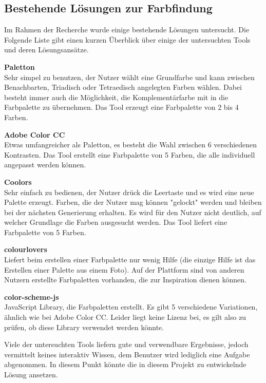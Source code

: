 \subsection{Bestehende Lösungen zur Farbfindung}
Im Rahmen der Recherche wurde einige bestehende Lösungen untersucht. Die Folgende Liste gibt einen kurzen Überblick über einige der untersuchten Tools und deren Lösungsansätze.

\textbf{Paletton} \\
Sehr simpel zu benutzen, der Nutzer wählt eine Grundfarbe und kann zwischen Benachbarten, Triadisch oder Tetraedisch angelegten Farben wählen. Dabei besteht immer auch die Möglichkeit, die Komplementärfarbe mit in die Farbpalette zu übernehmen. Das Tool erzeugt eine Farbpalette von 2 bis 4 Farben.

\textbf{Adobe Color CC} \\
Etwas umfangreicher als Paletton, es besteht die Wahl zwischen 6 verschiedenen Kontrasten. Das Tool erstellt eine Farbpalette von 5 Farben, die alle individuell angepasst werden können.

\textbf{Coolors} \\
Sehr einfach zu bedienen, der Nutzer drück die Leertaste und es wird eine neue Palette erzeugt. Farben, die der Nutzer mag können "gelockt" werden und bleiben bei der nächsten Generierung erhalten. Es wird für den Nutzer nicht deutlich, auf welcher Grundlage die Farben ausgesucht werden. Das Tool liefert eine Farbpalette von 5 Farben.

\textbf{colourlovers} \\
Liefert beim erstellen einer Farbpalette nur wenig Hilfe (die einzige Hilfe ist das Erstellen einer Palette aus einem Foto). Auf der Plattform sind von anderen Nutzern erstellte Farbpaletten vorhanden, die zur Inspiration dienen können.

\textbf{color-scheme-js} \\
JavaScript Library, die Farbpaletten erstellt. Es gibt 5 verschiedene Variationen, ähnlich wie bei Adobe Color CC. Leider liegt keine Lizenz bei, es gilt also zu prüfen, ob diese Library verwendet werden könnte.

Viele der untersuchten Tools liefern gute und verwendbare Ergebnisse, jedoch vermittelt keines interaktiv Wissen, dem Benutzer wird lediglich eine Aufgabe abgenommen. In diesem Punkt könnte die in diesem Projekt zu entwickelnde Lösung ansetzen.


